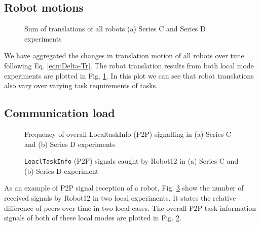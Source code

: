 \subsection*{Robot motions}
\begin{figure}
\centering
\hspace*{0.5cm}
\newline
\centering
{}
\caption{\small Sum of translations of all robots (a) Series C and Series D experiments }
\label{fig:translation-SC-SD} 
\end{figure}
We have aggregated the changes in translation motion of all robots over time following Eq. \ref{eqn:Delta-Tr}. The robot translation results from both local mode experiments are plotted in Fig. \ref{fig:translation-SC-SD}. In this plot we can see that robot translations also vary over varying task requirements of tasks. 
\subsection*{Communication load}
\begin{figure}
\centering
\hspace*{0.5cm}
\newline
\centering
{}
\caption{\small Frequency of overall LocaltaskInfo (P2P) signalling in (a) Series C and (b) Series D experiments}
\label{fig:local-signal-frequency-stat} %
\end{figure}
%
\begin{figure}
\centering
\hspace*{0.5cm}
\newline
{}
\caption{\small \texttt{LoaclTaskInfo} (P2P) signals caught by Robot12 in (a) Series C and (b) Series D experiment}
\label{fig:local-single-robot-signal} 
\end{figure}
As an example of P2P signal reception of a robot,  Fig. \ref{fig:local-single-robot-signal} show the number of received signals by Robot12 in two local experiments. It states the relative difference of peers over time in two local cases. The overall P2P task information signals of both of these local modes are plotted in Fig. \ref{fig:local-signal-frequency-stat}. 
